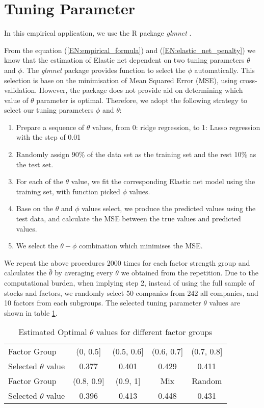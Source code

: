 \section{Tuning Parameter} \label{EN:parameter_tuning }
In this empirical application, we use the R package \textit{glmnet} \cite{Friedman2010, Simon2011}.

From the equation (\ref{EN:empirical_formula}) and (\ref{EN:elastic_net_penalty}) we know that the estimation of Elastic net dependent on two tuning parameters $\theta$ and $\phi$.
The \textit{glmnet} package provides function to select the $\phi$ automatically. 
This selection is base on the minimisation of Mean Squared Error (MSE), using cross-validation.
However, the package does not provide aid on determining which value of $\theta$ parameter is optimal.
Therefore, we adopt the following strategy to select our tuning parameters $\phi$  and $\theta$:
\begin{enumerate}
\item Prepare a sequence of $\theta$ values, from 0: ridge regression, to 1: Lasso regression with the step of 0.01
\item Randomly assign 90\% of the data set as the training set and the rest 10\% as the test set. 
\item For each of the $\theta$ value, we fit the corresponding Elastic net model using the training set, with function picked $\phi$ values.
\item Base on the $\theta$ and $\phi$ values select, we produce the predicted values using the test data, and calculate the MSE between the true values and predicted values.
\item We select the $\theta - \phi$ combination which minimises the MSE.
\end{enumerate}
We repeat the above procedures 2000 times for each factor strength group and
calculates the $\bar{\theta}$ by averaging every $\theta$ we obtained from the repetition.
Due to the computational burden, when implying step 2, instead of using the full sample of stocks and factors, we randomly select 50 companies from 242 all companies, and 10 factors from each subgroups.
The selected tuning parameter $\theta$ values are shown in table \ref{table:optimal_theta}.
\begin{table}[H]
	\centering
	\caption{Estimated Optimal $\theta$ values for different factor groups}
	\label{table:optimal_theta}
	\begin{tabular}{l|cccc}
		\hline
		\hline
		Factor Group            & (0, 0.5{]}   & (0.5, 0.6{]} & (0.6, 0.7{]} & (0.7, 0.8{]} \\ 
		Selected $\theta$ value & 0.377        & 0.401        & 0.429        & 0.411        \\ \hline
		Factor Group            & (0.8, 0.9{]} & (0.9, 1{]}   & Mix          & Random       \\ 
		Selected $\theta$ value & 0.396        & 0.413        & 0.448        & 0.431        \\ \hline
		\hline
	\end{tabular}
\end{table}
